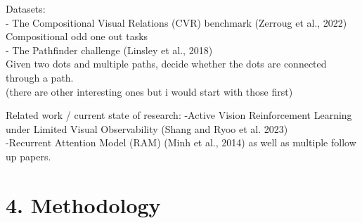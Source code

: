 \documentclass[12pt,a4paper]{article}
\begin{document}
Datasets:\\
- The Compositional Visual Relations (CVR) benchmark (Zerroug et al., 2022)\\
Compositional odd one out tasks\\
- The Pathfinder challenge (Linsley et al., 2018)\\
Given two dots and multiple paths, decide whether the dots are connected through a path.\\
(there are other interesting ones but i would start with those first)

Related work / current state of research:
-Active Vision Reinforcement Learning under Limited Visual Observability (Shang and Ryoo et al. 2023)\\
-Recurrent Attention Model (RAM) (Minh et al., 2014) as well as multiple follow up papers.

\section*{4. Methodology}
\end{document}
